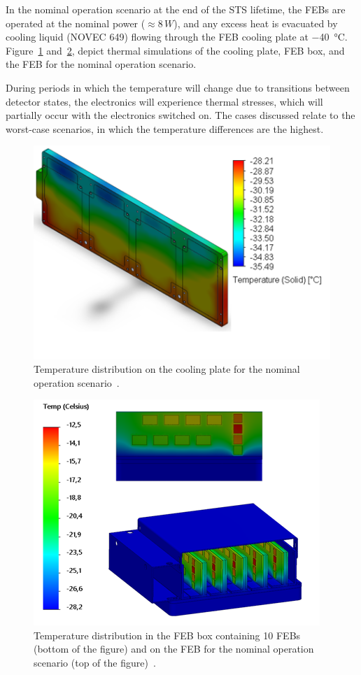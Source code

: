 In the nominal operation scenario at the end of the STS lifetime, the \glspl{FEB} are operated at the nominal power ($\approx8\,W$), and any excess heat is evacuated by cooling liquid (NOVEC 649) flowing through the \gls{FEB} cooling plate at \SI{-40}{\celsius}. Figure~\ref{fig_coolinkg_block_nominal} and~\ref{fig_nominal_febs}, depict thermal simulations of the cooling plate, \gls{FEB} box, and the \gls{FEB} for the nominal operation scenario.

During periods in which the temperature will change due to transitions between detector states, the electronics will experience thermal stresses, which will partially occur with the electronics switched on. The cases discussed relate to the worst-case scenarios, in which the temperature differences are the highest. 
    
\begin{figure}[!h]
\centering
\includegraphics[width=0.6\columnwidth]{Chapter4/images/cooling_block_nominal.png}
\caption{Temperature distribution on the cooling plate for the nominal operation scenario~\cite{Agarwal}.}
\label{fig_coolinkg_block_nominal}
\end{figure}

\newpage

\begin{figure}[!h]
\centering
\includegraphics[width=0.62\columnwidth]{Chapter4/images/nominal_febs.png}
\caption{Temperature distribution in the \gls{FEB} box containing 10 \glspl{FEB} (bottom of the figure) and on the \gls{FEB} for the nominal operation scenario (top of the figure)~\cite{Agarwal}. }
\label{fig_nominal_febs}
\end{figure}


